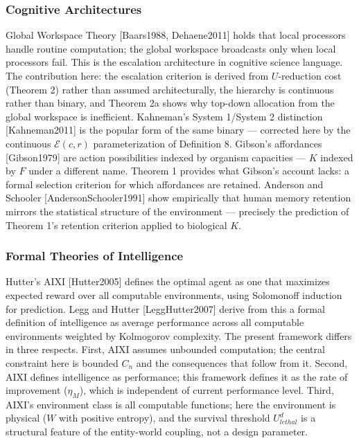 \documentclass[
]{article}
\begin{document}
\subsubsection{Cognitive Architectures}\label{cognitive-architectures}

Global Workspace Theory {[}Baars1988, Dehaene2011{]} holds that local
processors handle routine computation; the global workspace broadcasts
only when local processors fail. This is the escalation architecture in
cognitive science language. The contribution here: the escalation
criterion is derived from \(U\)-reduction cost (Theorem 2) rather than
assumed architecturally, the hierarchy is continuous rather than binary,
and Theorem 2a shows why top-down allocation from the global workspace
is inefficient. Kahneman's System 1/System 2 distinction
{[}Kahneman2011{]} is the popular form of the same binary --- corrected
here by the continuous \(\mathcal{E}(c, r)\) parameterization of
Definition 8. Gibson's affordances {[}Gibson1979{]} are action
possibilities indexed by organism capacities --- \(K\) indexed by \(F\)
under a different name. Theorem 1 provides what Gibson's account lacks:
a formal selection criterion for which affordances are retained.
Anderson and Schooler {[}AndersonSchooler1991{]} show empirically that
human memory retention mirrors the statistical structure of the
environment --- precisely the prediction of Theorem 1's retention
criterion applied to biological \(K\).

\subsubsection{Formal Theories of
Intelligence}\label{formal-theories-of-intelligence}

Hutter's AIXI {[}Hutter2005{]} defines the optimal agent as one that
maximizes expected reward over all computable environments, using
Solomonoff induction for prediction. Legg and Hutter
{[}LeggHutter2007{]} derive from this a formal definition of
intelligence as average performance across all computable environments
weighted by Kolmogorov complexity. The present framework differs in
three respects. First, AIXI assumes unbounded computation; the central
constraint here is bounded \(C_n\) and the consequences that follow from
it. Second, AIXI defines intelligence as performance; this framework
defines it as the rate of improvement (\(\eta_M\)), which is independent
of current performance level. Third, AIXI's environment class is all
computable functions; here the environment is physical (\(W\) with
positive entropy), and the survival threshold \(U_{lethal}^d\) is a
structural feature of the entity-world coupling, not a design parameter.
\end{document}
